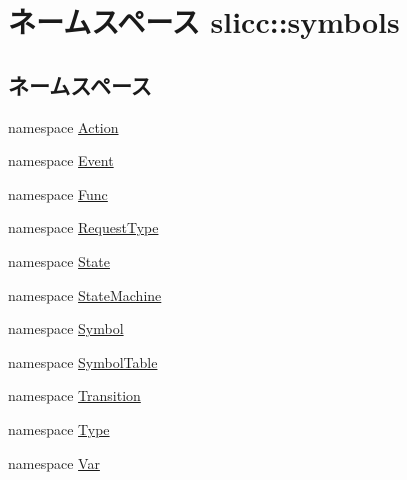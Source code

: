 \hypertarget{namespaceslicc_1_1symbols}{
\section{ネームスペース slicc::symbols}
\label{namespaceslicc_1_1symbols}
}
\subsection*{ネームスペース}
\begin{DoxyCompactItemize}
\item 
namespace \hyperlink{namespaceslicc_1_1symbols_1_1Action}{Action}
\item 
namespace \hyperlink{namespaceslicc_1_1symbols_1_1Event}{Event}
\item 
namespace \hyperlink{namespaceslicc_1_1symbols_1_1Func}{Func}
\item 
namespace \hyperlink{namespaceslicc_1_1symbols_1_1RequestType}{RequestType}
\item 
namespace \hyperlink{namespaceslicc_1_1symbols_1_1State}{State}
\item 
namespace \hyperlink{namespaceslicc_1_1symbols_1_1StateMachine}{StateMachine}
\item 
namespace \hyperlink{namespaceslicc_1_1symbols_1_1Symbol}{Symbol}
\item 
namespace \hyperlink{namespaceslicc_1_1symbols_1_1SymbolTable}{SymbolTable}
\item 
namespace \hyperlink{namespaceslicc_1_1symbols_1_1Transition}{Transition}
\item 
namespace \hyperlink{namespaceslicc_1_1symbols_1_1Type}{Type}
\item 
namespace \hyperlink{namespaceslicc_1_1symbols_1_1Var}{Var}
\end{DoxyCompactItemize}
